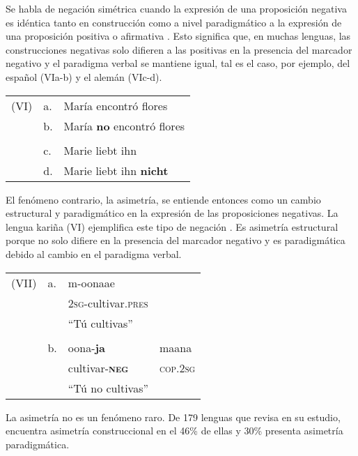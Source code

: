 \noindent Se habla de negación simétrica cuando la expresión de una proposición negativa es idéntica tanto en construcción como a nivel paradigmático a la expresión de una proposición positiva o afirmativa \textcolor{MidnightBlue}{\citep{Miestamo2005}}. Esto significa que, en muchas lenguas, las construcciones negativas solo difieren a las positivas en la presencia del marcador negativo y el paradigma verbal se mantiene igual, tal es el caso, por ejemplo, del español (VIa-b) y el alemán (VIc-d). \vspace{0.5cm}

{\setmainfont{Charis SIL}
\begin{tabular}{lll}
(VI) & a. & María encontró flores \\
& b. & María \textbf{no} encontró flores \\
& & \\
& c. & Marie liebt ihn \\
& d. & Marie liebt ihn \textbf{nicht} \\
\end{tabular} \vspace{0.5cm}}

El fenómeno contrario, la asimetría, se entiende entonces como un cambio estructural y paradigmático en la expresión de las proposiciones negativas. La lengua kariña (VI) ejemplifica este tipo de negación \textcolor{MidnightBlue}{\citep{Mosonyi2000}}. Es asimetría estructural porque no solo difiere en la presencia del marcador negativo y es paradigmática debido al cambio en el paradigma verbal. \vspace{0.5cm}

{\setmainfont{Charis SIL} 
\begin{tabular}{llll}
(VII) & a. & m-oonaae \\
& & \textsc{2sg}-cultivar.\textsc{pres} \\
& & ``Tú cultivas'' \\
& & & \\
& b. & oona-\textbf{ja} & maana \\
& & cultivar-\textsc{\textbf{neg}} & \textsc{cop.2sg} \\
& & ``Tú no cultivas'' \\
\end{tabular} \vspace{0.5cm}} 

La asimetría no es un fenómeno raro. De 179 lenguas que \textcolor{MidnightBlue}{\citet{Miestamo2005}} revisa en su estudio, encuentra asimetría construccional en el 46\% de ellas y 30\% presenta asimetría paradigmática.

